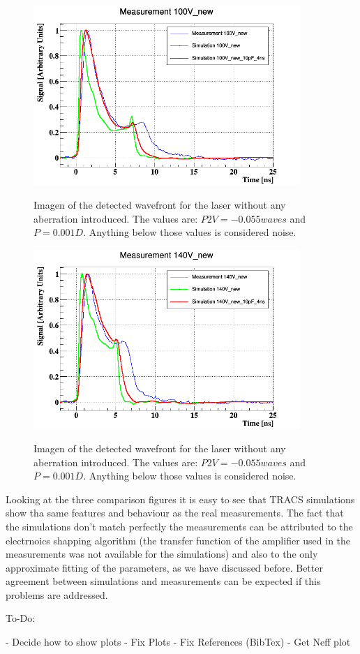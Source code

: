\begin{figure}[H]
	\centering
	\includegraphics[width=0.9\textwidth]{100V.png}
	\label{fig:mues2}
	\caption{Imagen of the detected wavefront for the laser without any aberration introduced. The values are: $P2V = -0.055waves$ and $P = 0.001D$. Anything below those values is considered noise.}
\end{figure}

\begin{figure}[H]
	\centering
	\includegraphics[width=0.9\textwidth]{140V.png}
	\label{fig:mues2}
	\caption{Imagen of the detected wavefront for the laser without any aberration introduced. The values are: $P2V = -0.055waves$ and $P = 0.001D$. Anything below those values is considered noise.}
\end{figure}

Looking at the three comparison figures it is easy to see that TRACS simulations show tha same features and behaviour as the real measurements. The fact that the simulations don't match perfectly the measurements can be attributed to the electrnoics shapping algorithm (the transfer function of the amplifier used in the measurements was not available for the simulations) and also to the only approximate fitting of the parameters, as we have discussed before. Better agreement between simulations and measurements can be expected if this problems are addressed.

To-Do:

- Decide how to show plots
- Fix Plots
- Fix References (BibTex)
- Get Neff plot

